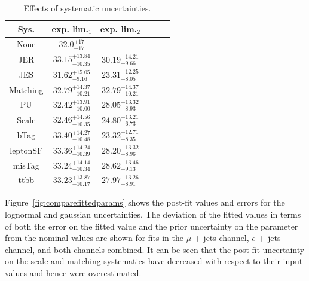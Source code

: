 \begin{table}[ht!]
\small
\centering
\begin{tabular}{|c |c |c | c | c | c |}
\hline
 Sys. &  exp. lim.$_{1}$ & exp. lim.$_{2}$   \\
 \hline  
None & $32.0^{+17}_{-17}$ & - \\
 \hline 
 JER &    $33.15^{+13.84}_{-10.35}$  &  $30.19^{+14.21}_{-9.66}$    \\
 \hline  
 JES  & $31.62^{+15.05}_{-9.16}$ &  $23.31^{+12.25}_{-8.05}$     \\
\hline  
Matching &  $32.79^{+14.37}_{-10.21}$ & $32.79^{+14.37}_{-10.21}$     \\  
 \hline  
 PU    &  $32.42^{+13.91}_{-10.00}$  &  $28.05^{+13.32}_{-8.93}$    \\
 \hline  
 Scale  &  $32.46^{+14.56}_{-10.35}$ & $24.80^{+13.21}_{-6.73}$       \\
 \hline  
 bTag &  $33.40^{+14.27}_{-10.48}$ & $23.32^{+12.71}_{-8.35}$       \\
 \hline  
 leptonSF &  $33.36^{+14.24}_{-10.39}$  &  $28.20^{+13.32}_{-8.96}$   \\  
 \hline  
 misTag &  $33.24^{+14.14}_{-10.34}$  &  $28.62^{+13.46}_{-9.13}$  \\
 \hline  
 ttbb  &  $33.23^{+13.87}_{-10.17}$  &  $27.97^{+13.26}_{-8.91}$  \\
 \hline
\end{tabular}
\caption{Effects of systematic uncertainties. }
\label{tab:effectLims}
\end{table}

Figure~\ref{fig:comparefittedparams} shows the post-fit values and errors for the lognormal and gaussian uncertainties. The deviation of the fitted values in terms of both the error on the fitted value and the prior uncertainty on the parameter from the nominal values are shown for fits in the $\mu$ + jets channel, $e$ + jets channel, and both channels combined. It can be seen that the post-fit uncertainty on the scale and matching systematics have decreased with respect to their input values and hence were overestimated. 

